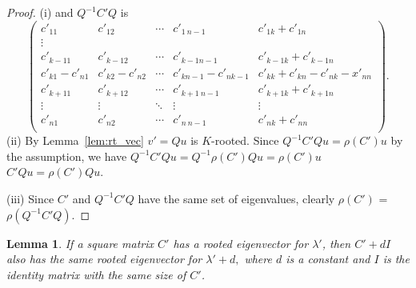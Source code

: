 \documentclass{article}
\theoremstyle{plain}
\newtheorem{lem}[thm]{Lemma}
\theoremstyle{definition}
\newtheorem{rem}[thm]{Remark}
\begin{document}

\begin{proof}
    (i)
    and $Q^{-1}C'Q$ is
    $$\begin{pmatrix}
    c'_{11}     & c'_{12} & \cdots     & c'_{1\ n-1} & c'_{1k}+c'_{1n} \\
    \vdots \\
    c'_{k-11}     & c'_{k-1 2}           & \cdots     & c'_{k-1 n-1} & c'_{k-1k}+c'_{k-1n} \\
    c'_{k1}-c'_{n1} & c'_{k2}-c'_{n2} &\cdots      &c'_{kn-1}-c'_{nk-1}& c'_{kk}+c'_{kn}-c'_{nk}-x'_{nn}\\
    c'_{k+11}     & c'_{k+12}           & \cdots     & c'_{k+1\ n-1} & c'_{k+1k}+c'_{k+1n} \\
    \vdots              & \vdots & \ddots              & \vdots & \vdots \\
    c'_{n1}             & c'_{n2} & \cdots             & c'_{n\ n-1} & c'_{nk}+c'_{nn} \\
    \end{pmatrix}.$$
    (ii)
        By Lemma~\ref{lem:rt_vec} $v'=Qu$ is $K$-rooted.  
        Since $Q^{-1}C'Qu=\rho(C')u$ by the assumption, we have
        $Q^{-1} C' Q u  = Q^{-1} \rho(C') Qu  =\rho(C')u$  \\
        $C'Qu=\rho(C')Qu$.

    (iii)
    Since $C'$ and $Q^{-1}C'Q$ have the same set of eigenvalues, clearly $\rho(C')$ = $\rho(Q^{-1}C'Q)$.

\end{proof}


\begin{lem}\label{l_diag}   %
If a square matrix $C'$ has a rooted eigenvector for $\lambda'$, then $C'+dI$ also has
the same rooted eigenvector for $\lambda'+d,$ where $d$ is a constant and $I$ is the identity matrix with the same size of $C'$.
\end{lem}
\end{document}
